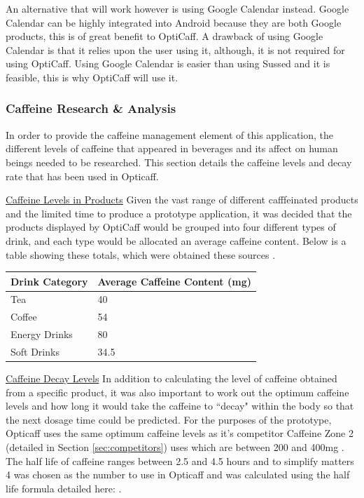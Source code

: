 An alternative that will work however is using Google Calendar instead. Google Calendar can be highly integrated into Android because they are both Google products, this is of great benefit to OptiCaff. A drawback of using Google Calendar is that it relies upon the user using it, although, it is not required for using OptiCaff. Using Google Calendar is easier than using Sussed and it is feasible, this is why OptiCaff will use it.

\subsubsection{Caffeine Research \& Analysis}
\label{sec:Caffeine}

In order to provide the caffeine management element of this application, the different levels of caffeine that appeared in beverages and its affect on human beings needed to be researched. This section details the caffeine levels and decay rate that has been used in Opticaff. 

\underline{Caffeine Levels in Products} \newline
Given the vast range of different cafffeinated products and the limited time to produce a prototype application, it was decided that the products displayed by OptiCaff would be grouped into four different types of drink, and each type would be allocated an average caffeine content. Below is a table showing these totals, which were obtained these sources \cite{Coke} \cite{TeaCoffee} \cite{EnergyDrink}.

\begin{center}
\begin{tabular}{|l|l|}
\hline
\textbf{Drink Category} & \textbf{Average Caffeine Content (mg)} \\\hline
Tea & 40 \\\hline
Coffee & 54 \\\hline
Energy Drinks & 80 \\\hline
Soft Drinks & 34.5 \\\hline
\end{tabular}
\end{center}

\underline{Caffeine Decay Levels} \newline
In addition to calculating the level of caffeine obtained from a specific product, it was also important to work out the optimum caffeine levels and how long it would take the caffeine to ``decay" within the body so that the next dosage time could be predicted. For the purposes of the prototype, Opticaff uses the same optimum caffeine levels as it's competitor Caffeine Zone 2 (detailed in Section \ref{sec:competitors}) uses which are between 200 and 400mg \cite{CaffeineZoneInfo}. The half life of caffeine ranges between 2.5 and 4.5 hours \cite{CaffeinePharmacology} \cite{CaffeinePharmacy} and to simplify matters 4 was chosen as the number to use in Opticaff and was calculated using the half life formula detailed here: \cite{HalfLife}.
 
